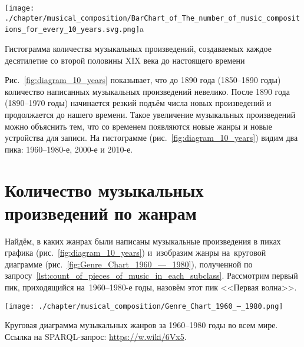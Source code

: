\begin{marginfigure}[-5\baselineskip]
    \texttt{[image: ./chapter/musical\_composition/BarChart\_of\_The\_number\_of\_music\_compositions\_for\_every\_10\_years.svg.png]}a
    \vspace{-7pt}
	\caption{Гистограмма количества музыкальных произведений, 
             создаваемых каждое десятилетие со второй половины XIX века до настоящего времени}%
	\label{fig:diagram_10_years}%
\end{marginfigure}
%
Рис.~\ref{fig:diagram_10_years} показывает, что до 1890 года (1850--1890 годы) 
количество написанных музыкальных произведений невелико. 
После 1890 года (1890--1970 годы) начинается резкий подъём числа новых произведений 
и продолжается до нашего времени. 
Такое увеличение музыкальных произведений можно объяснить тем, 
что со временем появляются новые жанры и новые устройства для записи. 
На гистограмме (рис.~\ref{fig:diagram_10_years}) видим два пика: 1960--1980-е, 2000-е и 2010-е.







\newpage
\section{Количество музыкальных произведений по жанрам}

Найдём, в каких жанрах были написаны музыкальные произведения 
в пиках графика (рис.~\ref{fig:diagram_10_years}) 
и~изобразим жанры на~круговой диаграмме (рис.~\ref{fig:Genre_Chart_1960_—_1980}), 
полученной по запросу~\ref{lst:count_of_pieces_of_music_in_each_subclass}. 
Рассмотрим первый пик, приходящийся на~1960--1980-е годы, назовём этот пик <<Первая волна>>.

\begin{marginfigure}[0\baselineskip]
	\texttt{[image: ./chapter/musical\_composition/Genre\_Chart\_1960\_—\_1980.png]}
	\caption[Круговая диаграмма музыкальных жанров за 1960--1980 годы во всем мире]{Круговая диаграмма музыкальных жанров за 1960--1980 годы во всем мире. Ссылка на SPARQL-запрос: \href{https://w.wiki/6Vx5}{https://w.wiki/6Vx5}.}%
	\label{fig:Genre_Chart_1960_—_1980}%
\end{marginfigure}

